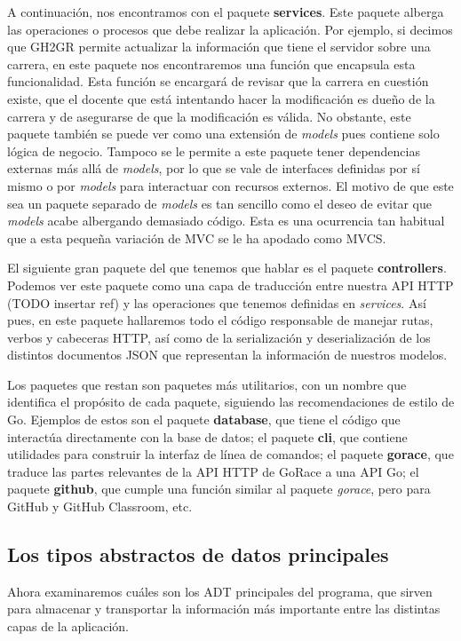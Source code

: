 A continuación, nos encontramos con el paquete \textbf{services}. Este paquete alberga las operaciones o procesos que debe realizar la aplicación. Por ejemplo, si decimos que GH2GR permite actualizar la información que tiene el servidor sobre una carrera, en este paquete nos encontraremos una función que encapsula esta funcionalidad. Esta función se encargará de revisar que la carrera en cuestión existe, que el docente que está intentando hacer la modificación es dueño de la carrera y de asegurarse de que la modificación es válida. No obstante, este paquete también se puede ver como una extensión de \textit{models} pues contiene solo lógica de negocio. Tampoco se le permite a este paquete tener dependencias externas más allá de \textit{models}, por lo que se vale de interfaces definidas por sí mismo o por \textit{models} para interactuar con recursos externos. El motivo de que este sea un paquete separado de \textit{models} es tan sencillo como el deseo de evitar que \textit{models} acabe albergando demasiado código. Esta es una ocurrencia tan habitual que a esta pequeña variación de \acrshort{MVC} se le ha apodado como \acrshort{MVCS}\cite{mvcs}.

El siguiente gran paquete del que tenemos que hablar es el paquete \textbf{controllers}. Podemos ver este paquete como una capa de traducción entre nuestra \acrshort{API} \acrshort{HTTP} (TODO insertar ref) y las operaciones que tenemos definidas en \textit{services}. Así pues, en este paquete hallaremos todo el código responsable de manejar rutas, verbos y cabeceras \acrshort{HTTP}, así como de la serialización y deserialización de los distintos documentos \acrshort{JSON} que representan la información de nuestros modelos.

Los paquetes que restan son paquetes más utilitarios, con un nombre que identifica el propósito de cada paquete, siguiendo las recomendaciones de estilo de Go\cite{goPackageNames}. Ejemplos de estos son el paquete \textbf{database}, que tiene el código que interactúa directamente con la base de datos; el paquete \textbf{cli}, que contiene utilidades para construir la interfaz de línea de comandos; el paquete \textbf{gorace}, que traduce las partes relevantes de la \acrshort{API} \acrshort{HTTP} de GoRace a una \acrshort{API} Go; el paquete \textbf{github}, que cumple una función similar al paquete \textit{gorace}, pero para GitHub y GitHub Classroom, etc.

\subsection{Los tipos abstractos de datos principales}
Ahora examinaremos cuáles son los \acrshort{ADT} principales del programa, que sirven para almacenar y transportar la información más importante entre las distintas capas de la aplicación.

